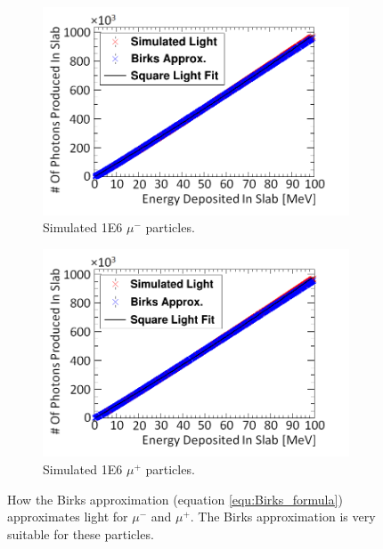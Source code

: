 \begin{figure}[htbp]
\centering
\begin{subfigure}{.5\textwidth}
  \centering
  \includegraphics[width=\linewidth]{Appendix5/newNewFigs/mu-BirksSlab_simAndApproxLight.png}
  \captionsetup{width=.9\linewidth}
  \caption{Simulated 1E6 $\mu^-$ particles.}
  \label{subfig:append5_light_of_muons0-100mev}
\end{subfigure}%
\begin{subfigure}{.5\textwidth}
  \centering
  \includegraphics[width=\linewidth]{Appendix5/newNewFigs/mu+BirksSlab_simAndApproxLight.png}
  \captionsetup{width=.9\linewidth}
  \caption{Simulated 1E6 $\mu^+$ particles.}
  \label{subfig:append5_light_of_Amuons0-100mev}
\end{subfigure}
\caption{How the Birks approximation (equation \ref{equ:Birks_formula}) approximates light for $\mu^-$ and $\mu^+$. The Birks approximation is very suitable for these particles.}
\label{fig:append5_light_of_muons_Amuons0-100mev}
\end{figure}

